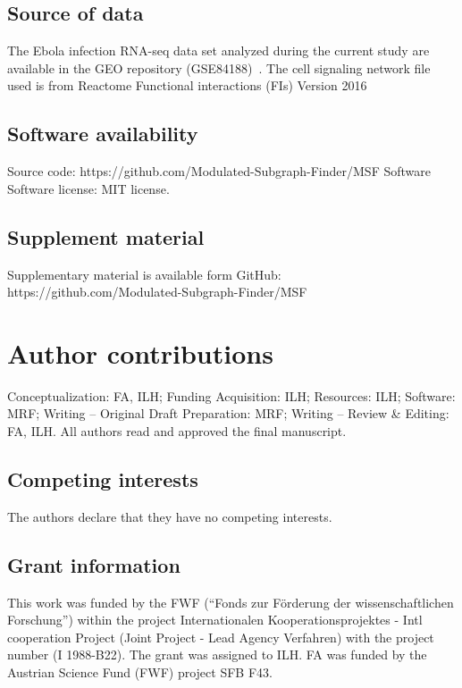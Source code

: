 \documentclass[10pt,a4paper,twocolumn]{article}
\begin{document}
	\subsection*{Source of data}
	
	The Ebola infection RNA-seq data set analyzed during the
        current study are available in the GEO repository
        (GSE84188)~\cite{Olejnik}. The cell signaling network file
        used is from Reactome Functional interactions (FIs) Version
        2016~\cite{Cytokegg}
	
	\subsection*{Software availability}
	
	\noindent
	Source code: \newline
	https://github.com/Modulated-Subgraph-Finder/MSF \newline Software
	Software license: MIT license.
	
	\subsection*{Supplement material}
	Supplementary material is available form GitHub: https://github.com/Modulated-Subgraph-Finder/MSF
	
	\section*{Author contributions}
	Conceptualization: FA, ILH; Funding Acquisition: ILH; Resources: ILH;
	Software: MRF; Writing – Original Draft Preparation: MRF; Writing – Review
	\& Editing: FA, ILH. All authors read and approved the final manuscript.
	
	\subsection*{Competing interests}
	
	The authors declare that they have no competing interests.
	
	\subsection*{Grant information}
	
	This work was funded by the FWF (“Fonds zur F{\"o}rderung der
        wissenschaftlichen Forschung”) within the project
        Internationalen Kooperationsprojektes - Intl cooperation
        Project (Joint Project - Lead Agency Verfahren) with the
        project number (I 1988-B22). The grant was assigned to ILH. FA
        was funded by the Austrian Science Fund (FWF) project SFB F43.
	
\end{document}
